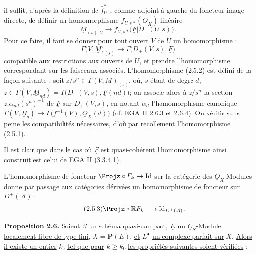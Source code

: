 
il
suffit, d'après la définition de $\bar f^{*}_{U,s}$ comme adjoint à gauche du foncteur image directe, de définir un homomorphisme $f_{U,s*}(\underline{O}_X)$-linéaire
\[
  \underline{M}_{(s),U}\longrightarrow f_{U,s*}\bigl(\underline{F}|D_+(U,s)\bigr).
\]
Pour ce faire, il faut se donner pour tout ouvert $V$ de $U$ un homomorphisme :
\begin{equation}\tag{2.5.2}
  \Gamma\bigl(V,\underline{M}\bigr)_{(s)}\longrightarrow \Gamma\bigl(D_+(V,s),\underline{F}\bigr)
\end{equation}
compatible aux restrictions aux ouverts de $U$, et prendre l'homomorphisme correspondant sur les faisceaux associés. L'homomorphisme (2.5.2) est défini de la façon suivante : soit $z/s^n\in\Gamma(V,\underline{M})_{(s)}$, où, $s$ étant de degré $d$, $z\in\Gamma(V,\underline{M}_{nd})=\Gamma\bigl(D_+(V,s),\underline{F}(nd)\bigr)$; on associe alors à $z/s^n$ la section $z.\alpha_{nd}(s^n)^{-1}$ de $\underline{F}$ sur $D_+(V,s)$, en notant $\alpha_d$ l'homomorphisme canonique $\Gamma(V,\underline{B}_d)\longrightarrow \Gamma\bigl(f^{-1}(V),\underline{O}_X(d)\bigr)$ (cf. EGA II 2.6.3 et 2.6.4). On vérifie sans peine les compatibilités nécessaires, d'où par recollement l'homomorphisme (2.5.1).

Il est clair que dans le cas où $\underline{F}$ est quasi-cohérent l'homomorphisme ainsi construit est celui de EGA II (3.3.4.1).

L'homomorphisme de foncteur $\Projz\circ F_k\to \operatorname{Id}$ sur la catégorie des $\underline{O}_X$-Modules donne par passage aux catégories dérivées un homomorphisme de foncteur sur $D^+(\mathcal A)$ :
\begin{equation}\tag{2.5.3}
  \Projz\circ\mathbb R F_k\longrightarrow \operatorname{Id}_{D^+(\mathcal A)}.
\end{equation}

\textbf{Proposition 2.6.} \uline{Soient} $S$ \uline{un schéma quasi}-\uline{compact}, $\underline{E}$ \uline{un} $\underline{O}_S$\uline{-Module localement libre de type fini}, $X=\mathbf P(\underline{E})$, \uline{et} $\underline{L}^{\bullet}$ \uline{un complexe parfait sur} $X$. \uline{Alors} \uline{il existe un entier} $k_0$ \uline{tel que pour} $k\geq k_0$ \uline{les propriétés suivantes soient vérifiées} :
